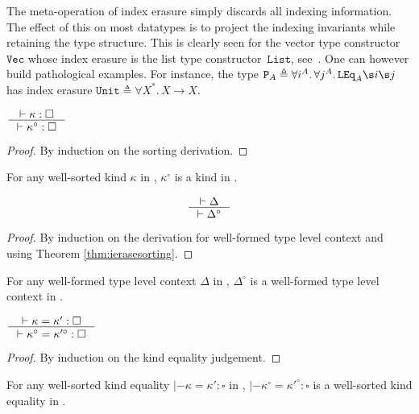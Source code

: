 \begin{example}\label{PathologicalExample}
The meta-operation of index erasure simply discards all indexing
information.  The effect of this on most datatypes is to project the
indexing invariants while retaining the type structure.  
%
This is clearly seen for the vector type constructor~$\mathtt{Vec}$ whose
index erasure is the list type constructor~$\mathtt{List}$,
see~.
%
One can however build pathological examples.  For instance, the
type $\mathtt P_A \triangleq \forall i^A.\,\forall j^A.\, \LEq_A\s i \s j$
has index erasure $\mathtt{Unit} \triangleq \forall X^\mathtt{*}.\,X\to
X$.
\end{example}

\begin{theorem}
\label{thm:ierasesorting}
	$\inference{|- \kappa : \square}{|- \kappa^\circ : \square}$
\end{theorem}
\begin{proof}
	By induction on the sorting derivation.
\end{proof}
\begin{remark}
For any well-sorted kind $\kappa$ in \Fi,
$\kappa^\circ$ is a kind in \Fw.
\end{remark}

\begin{theorem}
\label{thm:ierasetyctx}
\[ \inference{|- \Delta}{|- \Delta^\circ} \]
\end{theorem}
\begin{proof}
	By induction on the derivation for well-formed type level context
	and using Theorem \ref{thm:ierasesorting}.
\end{proof}
\begin{remark}
For any well-formed type level context $\Delta$ in \Fi,
$\Delta^\circ$ is a well-formed type level context in \Fw.
\end{remark}

\begin{theorem}\label{thm:ierasekindeq}
$ \inference{|- \kappa=\kappa':\square}
	{|- \kappa^\circ=\kappa'^\circ:\square}
$
\end{theorem}
\begin{proof}
	By induction on the kind equality judgement.
\end{proof}
\begin{remark}
For any well-sorted kind equality $|- \kappa=\kappa':\square$ in \Fi,
$|- \kappa^\circ=\kappa'^\circ:\square$ is a well-sorted kind equality in \Fw.
\end{remark}

